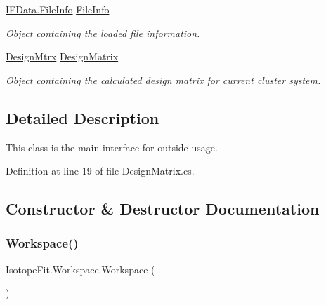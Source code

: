 \begin{DoxyCompactItemize}
\mbox{\hyperlink{class_isotope_fit_1_1_i_f_data_1_1_file_info}{I\+F\+Data.\+File\+Info}} \mbox{\hyperlink{class_isotope_fit_1_1_workspace_a54c0025eccacbf519f619ef256414a92}{File\+Info}}
\begin{DoxyCompactList}\small\item\em Object containing the loaded file information. \end{DoxyCompactList}\item 
\mbox{\hyperlink{class_isotope_fit_1_1_workspace_1_1_design_mtrx}{Design\+Mtrx}} \mbox{\hyperlink{class_isotope_fit_1_1_workspace_ae24a2ee8f965fb2ed7ad3a592163271d}{Design\+Matrix}}
\begin{DoxyCompactList}\small\item\em Object containing the calculated design matrix for current cluster system. \end{DoxyCompactList}\end{DoxyCompactItemize}


\subsection{Detailed Description}
This class is the main interface for outside usage. 



Definition at line 19 of file Design\+Matrix.\+cs.



\subsection{Constructor \& Destructor Documentation}
\mbox{\label{class_isotope_fit_1_1_workspace_affa8b6ac937cee367c225c606782da17}} 
\subsubsection{\texorpdfstring{Workspace()}{Workspace()}\hspace{0.1cm}{\footnotesize\ttfamily [1/2]}}
{\footnotesize\ttfamily Isotope\+Fit.\+Workspace.\+Workspace (\begin{DoxyParamCaption}{ }\end{DoxyParamCaption})}




